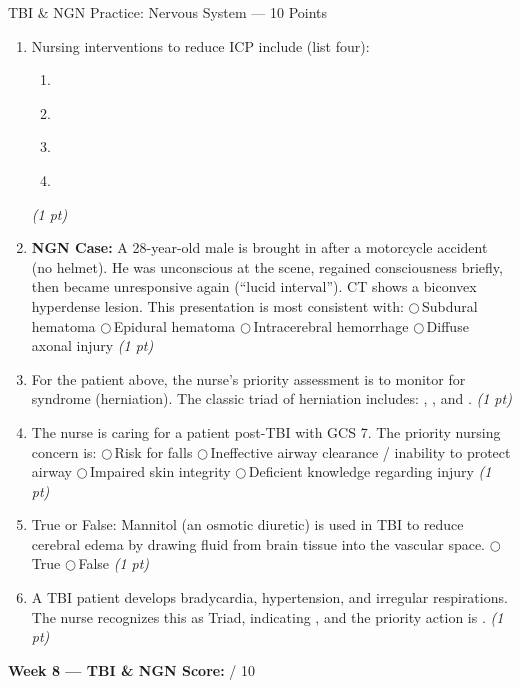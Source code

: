 \documentclass[11pt,letterpaper]{article}
\newcommand{\blank}[1][3cm]{\underline{\hspace{#1}}}
\begin{document}
\begin{diagbox}{TBI \& NGN Practice: Nervous System --- 10 Points}
\begin{enumerate}[leftmargin=1.5em, label=\textbf{\arabic*.},start=81]
  \item Nursing interventions to reduce ICP include (list four):
        \begin{enumerate}[label=\arabic*.]
          \item \blank[6cm]
          \item \blank[6cm]
          \item \blank[6cm]
          \item \blank[6cm]
        \end{enumerate}
        \hfill\textit{(1 pt)}

  \item \textbf{NGN Case:} A 28-year-old male is brought in after a motorcycle accident
        (no helmet).  He was unconscious at the scene, regained consciousness briefly,
        then became unresponsive again (``lucid interval'').  CT shows a biconvex
        hyperdense lesion.  This presentation is most consistent with:
        $\bigcirc$\,Subdural hematoma
        $\bigcirc$\,Epidural hematoma
        $\bigcirc$\,Intracerebral hemorrhage
        $\bigcirc$\,Diffuse axonal injury
        \hfill\textit{(1 pt)}

  \item For the patient above, the nurse's priority assessment is to monitor
        for \blank[4cm] syndrome (herniation).  The classic triad of
        herniation includes: \blank[3cm], \blank[3cm], and \blank[3cm].
        \hfill\textit{(1 pt)}

  \item The nurse is caring for a patient post-TBI with GCS 7.  The priority
        nursing concern is:
        $\bigcirc$\,Risk for falls
        $\bigcirc$\,Ineffective airway clearance / inability to protect airway
        $\bigcirc$\,Impaired skin integrity
        $\bigcirc$\,Deficient knowledge regarding injury
        \hfill\textit{(1 pt)}

  \item True or False: Mannitol (an osmotic diuretic) is used in TBI to reduce
        cerebral edema by drawing fluid from brain tissue into the vascular space.
        \quad$\bigcirc$\,True \quad$\bigcirc$\,False
        \hfill\textit{(1 pt)}

  \item A TBI patient develops bradycardia, hypertension, and irregular respirations.
        The nurse recognizes this as \blank[4cm] Triad, indicating
        \blank[4cm], and the priority action is \blank[4cm].
        \hfill\textit{(1 pt)}

\end{enumerate}

\vspace{0.3cm}
\textbf{Week 8 --- TBI \& NGN Score:} \blank[1cm] / 10
\end{diagbox}
\end{document}
